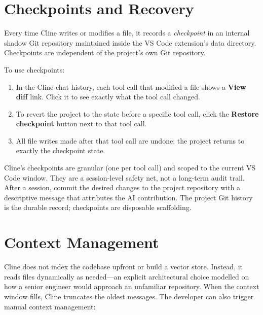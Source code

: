 \section{Checkpoints and Recovery}
\label{app:cline:checkpoints}

Every time Cline writes or modifies a file, it records a \emph{checkpoint}
in an internal shadow Git repository maintained inside the VS Code extension's
data directory.  Checkpoints are independent of the project's own Git repository.

To use checkpoints:

\begin{enumerate}
  \item In the Cline chat history, each tool call that modified a file shows
        a \textbf{View diff} link.  Click it to see exactly what the tool call
        changed.
  \item To revert the project to the state before a specific tool call, click
        the \textbf{Restore checkpoint} button next to that tool call.
  \item All file writes made after that tool call are undone; the project
        returns to exactly the checkpoint state.
\end{enumerate}

\begin{remark}
\label{rem:cline-checkpoints-vs-git}
Cline's checkpoints are granular (one per tool call) and scoped to the current
VS Code window.  They are a session-level safety net, not a long-term audit
trail.  After a session, commit the desired changes to the project repository
with a descriptive message that attributes the AI contribution.  The project
Git history is the durable record; checkpoints are disposable scaffolding.
\end{remark}

\section{Context Management}
\label{app:cline:context}

Cline does not index the codebase upfront or build a vector store.  Instead,
it reads files dynamically as needed---an explicit architectural choice modelled
on how a senior engineer would approach an unfamiliar repository.  When the
context window fills, Cline truncates the oldest messages.  The developer can
also trigger manual context management:

